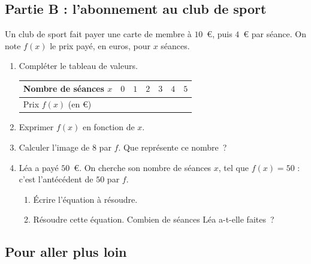 \documentclass{article}
\begin{document}
\newpage
\subsection*{Partie B : l'abonnement au club de sport}

Un club de sport fait payer une carte de membre à $10$~€, puis $4$~€ par séance. On note $f(x)$ le prix payé, en euros, pour $x$ séances.

\begin{enumerate}[resume]
  \item Compléter le tableau de valeurs.

  \medskip
  \begin{center}
    \renewcommand{\arraystretch}{1.6}
    \begin{tabular}{|C{4.2cm}|*{6}{C{1.4cm}|}}
      \hline
      Nombre de séances $x$ & $0$ & $1$ & $2$ & $3$ & $4$ & $5$ \\ \hline
      Prix $f(x)$ (en €) & & & & & & \\ \hline
    \end{tabular}
  \end{center}

  \item Exprimer $f(x)$ en fonction de $x$. \dotfill

  \item Calculer l'image de $8$ par $f$. Que représente ce nombre~?

  \medskip
  \dotfill

  \medskip
  \dotfill

  \item Léa a payé $50$~€. On cherche son nombre de séances $x$, tel que $f(x) = 50$ : c'est l'antécédent de $50$ par $f$.
  \begin{enumerate}[label=\alph*.]
    \item Écrire l'équation à résoudre. \dotfill

    \item Résoudre cette équation. Combien de séances Léa a-t-elle faites~?

    \medskip
    \dotfill

    \medskip
    \dotfill

    \medskip
    \dotfill
  \end{enumerate}
\end{enumerate}

\subsection*{Pour aller plus loin}
\end{document}
